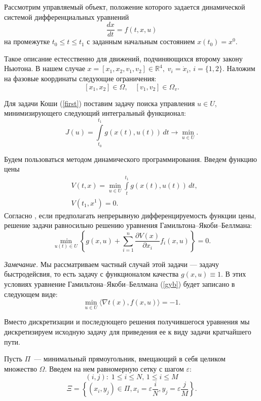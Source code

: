 Рассмотрим управляемый объект, положение которого задается динамической системой дифференциальных уравнений
\begin{equation}\label{first}
    \frac{dx}{dt} = f(t, x, u)
\end{equation}
на промежутке $t_0 \leqslant t \leqslant t_1$ с заданным начальным состоянием $x(t_0) = x^0$.

Такое описание естесственно для движений, подчиняющихся второму закону Ньютона.
В нашем случае $x = [x_1, x_2, v_1, v_2]\in \mathbb{R}^4,\;v_i=\dot x_i,\,i=\{1,2\}$.
Наложим на фазовые координаты следующие ограничения:
\[
    [x_1, x_2] \in \Omega, \quad [v_1, v_2] \in \Omega_v.
\]

Для задачи Коши (\ref{first}) поставим задачу поиска управления $u \in U$, минимизирующего следующий интегральный функционал:
\begin{equation}
    J(u) = \int\limits_{t_0}^{t_1} g(x(t), u(t))\,dt \rightarrow \min\limits_{u\in U}.
\end{equation}

Будем пользоваться методом динамического программирования. Введем функцию цены
\[
    \begin{aligned}
        &V(t,x) = \min\limits_{u \in U}\int\limits_{t}^{t_1}g(x(t), u(t))\,dt,\\
        &V(t_1,x^1) = 0.
    \end{aligned}
\]
Согласно \cite{optcontrol}, если предполагать непрерывную дифференцируемость функции цены, решение задачи равносильно решению уравнения Гамильтона--Якоби--Беллмана:
\begin{equation}\label{gyb}
    \min\limits_{u(t) \in U}\left\{
        g(x,u) + \sum\limits_{i=1}^{n}\frac{\partial V(x)}{\partial x_i} f_i(x,u)
    \right\} = 0.
\end{equation}

\textit{Замечание.}
Мы рассматриваем частный случай этой задачи --- задачу быстродейсвия, то есть задачу с функционалом качества $g(x,u) \equiv 1$. В этих условиях уравнение Гамильтона--Якоби--Беллмана (\ref{gyb}) будет записано в следующем виде:
\[
    \min\limits_{u\in U}\langle \nabla t(x), f(x,u) \rangle = -1.
\]

Вместо дискретизации и последующего решения получившегося уравнения мы дискретизируем исходную задачу для приведения ее к виду задачи кратчайшего пути.

Пусть $\Pi$~--- минимальный прямоугольник, вмещающий в себя целиком множество $\Omega$. Введем на нем равномерную сетку с шагом $\varepsilon$:
\begin{equation}
    (i,j):\;1\leqslant i \leqslant N,\,1\leqslant i \leqslant M
\end{equation}
\begin{equation}
    \Xi = \left\{ (x_i , y_j) \in \Pi , x_i = \varepsilon\frac{i}{N} , y_j = \varepsilon\frac{j}{M} \right\}.
\end{equation}

